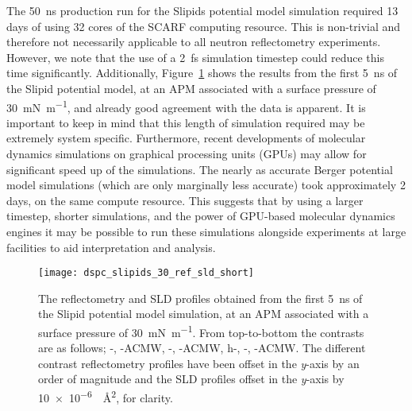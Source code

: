 \documentclass[amsmath,amssymb,twocolumn,superscriptaddress]{revtex4-1}
\begin{document}
The \SI{50}{\nano\second} production run for the Slipids potential model simulation required 13 days of using 32 cores of the SCARF computing resource.
This is non-trivial and therefore not necessarily applicable to all neutron reflectometry experiments.
However, we note that the use of a \SI{2}{\femto\second} simulation timestep could reduce this time significantly.
Additionally, Figure~\ref{fig:5ns} shows the results from the first \SI{5}{\nano\second} of the Slipid potential model, at an APM associated with a surface pressure of \SI{30}{\milli\newton\per\meter}, and already good agreement with the data is apparent.
It is important to keep in mind that this length of simulation required may be extremely system specific.
Furthermore, recent developments of molecular dynamics simulations on graphical processing units (GPUs) may allow for significant speed up of the simulations.
The nearly as accurate Berger potential model simulations (which are only marginally less accurate) took approximately 2 days, on the same compute resource.
This suggests that by using a larger timestep, shorter simulations, and the power of GPU-based molecular dynamics engines it may be possible to run these simulations alongside experiments at large facilities to aid interpretation and analysis.
%
\begin{figure}
 \centering
 \texttt{[image: dspc\_slipids\_30\_ref\_sld\_short]}
 \caption{The reflectometry and SLD profiles obtained from the first \SI{5}{\nano\second} of the Slipid potential model simulation, at an APM associated with a surface pressure of \SI{30}{\milli\newton\per\meter}. From top-to-bottom the contrasts are as follows; -, -ACMW, -, -ACMW, h-, -, -ACMW. The different contrast reflectometry profiles have been offset in the \emph{y}-axis by an order of magnitude and the SLD profiles offset in the \emph{y}-axis by \SI{10e-6}{\per\square\angstrom}, for clarity.}
 \label{fig:5ns}
\end{figure}
%
\end{document}
